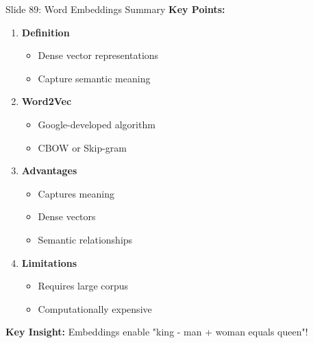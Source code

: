 \documentclass[8pt]{beamer}
\begin{document}
	\begin{frame}{Slide 89: Word Embeddings Summary}
		\fontsize{6.5}{7.5}\selectfont
		\textbf{Key Points:}
		\begin{enumerate}
			\item \textbf{Definition}
			\begin{itemize}
				\item Dense vector representations
				\item Capture semantic meaning
			\end{itemize}
			\item \textbf{Word2Vec}
			\begin{itemize}
				\item Google-developed algorithm
				\item CBOW or Skip-gram
			\end{itemize}
			\item \textbf{Advantages}
			\begin{itemize}
				\item Captures meaning
				\item Dense vectors
				\item Semantic relationships
			\end{itemize}
			\item \textbf{Limitations}
			\begin{itemize}
				\item Requires large corpus
				\item Computationally expensive
			\end{itemize}
		\end{enumerate}
		
		\textcolor{myblue}{\textbf{Key Insight:}} Embeddings enable "king - man + woman equals queen"!
	\end{frame}
	
\end{document}
